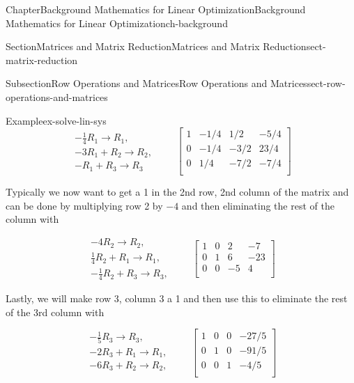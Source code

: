 \documentclass[oneside,10pt,]{book}
\numberwithin{equation}{section}
\newcommand{\amp}{&}
\begin{document}
\begin{chapterptx}{Chapter}{Background Mathematics for Linear Optimization}{}{Background Mathematics for Linear Optimization}{}{}{ch-background}
\begin{sectionptx}{Section}{Matrices and Matrix Reduction}{}{Matrices and Matrix Reduction}{}{}{sect-matrix-reduction}
\begin{subsectionptx}{Subsection}{Row Operations and Matrices}{}{Row Operations and Matrices}{}{}{sect-row-operations-and-matrices}
\begin{example}{Example}{}{ex-solve-lin-sys}
\begin{equation*}
\begin{array}{r} -\frac{1}{4} R_1 \to R_1, \\ -3 R_1 + R_2 \to R_2, \\ -R_1 + R_3 \to R_3 \end{array} \qquad \left[\begin{array}{rrr|r} 1 \amp -1/4 \amp 1/2 \amp -5/4\\ 0 \amp -1/4 \amp -3/2 \amp 23/4\\ 0 \amp 1/4 \amp -7/2 \amp -7/4\\ \end{array} \right]
\end{equation*}
%
\par
Typically we now want to get a 1 in the 2nd row, 2nd column of the matrix and can be done by multiplying row 2 by \(-4\) and then eliminating the rest of the column with%
\par
%
\begin{equation*}
\begin{array}{r} -4 R_2 \to R_2, \\ \frac{1}{4} R_2 + R_1 \to R_1, \\ -\frac{1}{4} R_2 + R_3 \to R_3, \end{array} \qquad \left[\begin{array}{rrr|r} 1 \amp 0 \amp 2 \amp -7\\ 0 \amp 1 \amp 6 \amp -23\\ 0 \amp 0 \amp -5 \amp 4\\ \end{array} \right]
\end{equation*}
%
\par
Lastly, we will make row 3, column 3 a 1 and then use this to eliminate the rest of the 3rd column with%
\par
%
\begin{equation}
\begin{array}{r} -\frac{1}{5} R_3 \to R_3, \\ -2 R_3 + R_1 \to R_1, \\ -6 R_3 + R_2 \to R_2, \\ \end{array} \qquad \left[\begin{array}{rrr|r} 1 \amp 0 \amp 0 \amp -27/5\\ 0 \amp 1 \amp 0 \amp -91/5\\ 0 \amp 0 \amp 1 \amp -4/5\\ \end{array} \right]\label{eq-lin-sys-rref}
\end{equation}

\end{example}
\end{subsectionptx}
\end{sectionptx}
\end{chapterptx}
\end{document}
